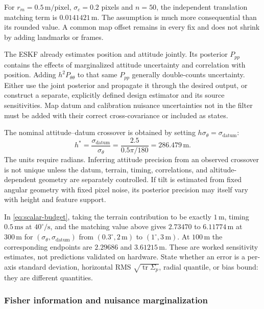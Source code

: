 For $r_m=0.5\,\mathrm{m/pixel}$, $\sigma_c=0.2$ pixels and $n=50$,
the independent translation matching term is
$0.0141421\,\mathrm m$. The assumption is much more consequential than
its rounded value. A common map offset remains in every fix and does
not shrink by adding landmarks or frames.

The ESKF already estimates position and attitude jointly. Its posterior
$P_{pp}$ contains the effects of marginalized attitude uncertainty and
correlation with position. Adding $h^2P_{\theta\theta}$ to that same
$P_{pp}$ generally double-counts uncertainty. Either use the joint
posterior and propagate it through the desired output, or construct a
separate, explicitly defined design estimator and its source sensitivities.
Map datum and calibration nuisance uncertainties not in the filter
must be added with their correct cross-covariance or included as states.

The nominal attitude--datum crossover is obtained by setting
$h\sigma_\theta=\sigma_{\mathrm{datum}}$:
\begin{equation}
 h^*=\frac{\sigma_{\mathrm{datum}}}{\sigma_\theta}
      =\frac{2.5}{0.5\pi/180}=286.479\,\mathrm m.
\end{equation}
The units require radians. Inferring attitude precision from an observed
crossover is not unique unless the datum, terrain, timing, correlations,
and altitude-dependent geometry are separately controlled. If tilt is
estimated from fixed angular geometry with fixed pixel noise, its
posterior precision may itself vary with height and feature support.

In \eqref{eq:scalar-budget}, taking the terrain contribution to be exactly
$1\,\mathrm m$, timing $0.5\,\mathrm{ms}$ at $40^\circ/\mathrm s$, and
the matching value above gives $2.73470$ to $6.11774\,\mathrm m$ at
$300\,\mathrm m$ for $(\sigma_\theta,\sigma_{\mathrm{datum}})$ from
$(0.3^\circ,2\,\mathrm m)$ to $(1^\circ,3\,\mathrm m)$. At
$100\,\mathrm m$ the corresponding endpoints are $2.29686$ and
$3.61215\,\mathrm m$. These are worked sensitivity estimates, not
predictions validated on hardware. State whether an error is a
per-axis standard deviation, horizontal RMS $\sqrt{\operatorname{tr}
\Sigma_p}$, radial quantile, or bias bound: they are different quantities.

\subsubsection{Fisher information and nuisance marginalization}


